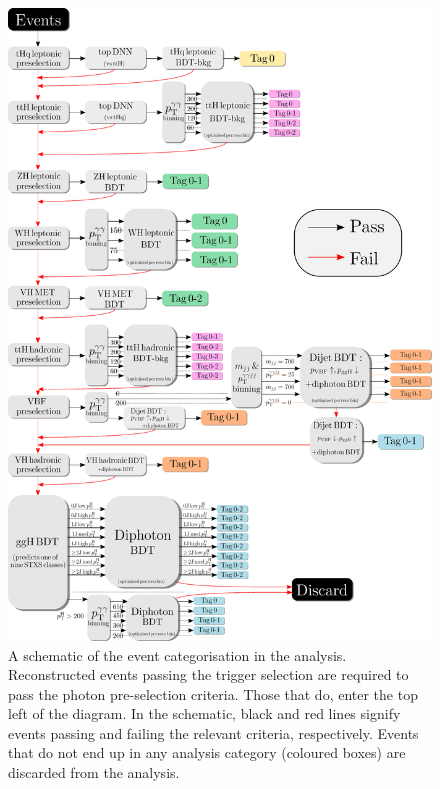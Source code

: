 \begin{figure}[htb!]
  \centering
  \includegraphics[width=.9\textwidth]{Figures/app_categorisation/categorisation_schematic.pdf}
  \caption[Schematic of the \Hgg event categorisation]
  {
    A schematic of the event categorisation in the \Hgg analysis. Reconstructed events passing the trigger selection are required to pass the photon pre-selection criteria. Those that do, enter the top left of the diagram. In the schematic, black and red lines signify events passing and failing the relevant criteria, respectively. Events that do not end up in any analysis category (coloured boxes) are discarded from the analysis.
  }
  \label{fig:categorisation_schematic}
\end{figure}